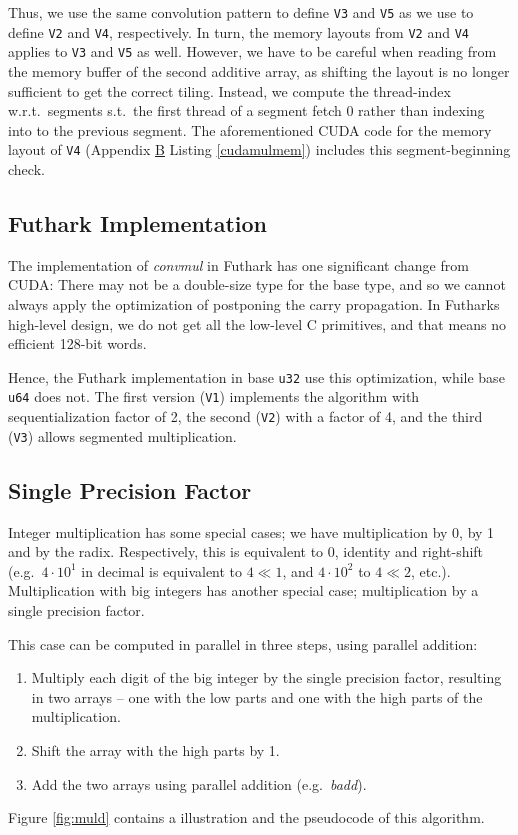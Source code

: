 Thus, we use the same convolution pattern to define \texttt{V3} and \texttt{V5}
as we use to define \texttt{V2} and \texttt{V4}, respectively. In turn, the
memory layouts from \texttt{V2} and \texttt{V4} applies to \texttt{V3} and
\texttt{V5} as well. However, we have to be careful when reading from the memory
buffer of the second additive array, as shifting the layout is no longer
sufficient to get the correct tiling. Instead, we compute the thread-index
w.r.t.\ segments s.t.\ the first thread of a segment fetch $0$ rather than
indexing into to the previous segment. The aforementioned CUDA code for the
memory layout of \texttt{V4} (Appendix \hyperref[app:B]{B} Listing
\ref{cudamulmem}) includes this segment-beginning check.

\subsection{Futhark Implementation}
\label{subsec:mulfut}

The implementation of \textit{convmul} in Futhark has one significant change
from CUDA: There may not be a double-size type for the base type, and so we
cannot always apply the optimization of postponing the carry propagation. In
Futharks high-level design, we do not get all the low-level C primitives, and
that means no efficient 128-bit words.

Hence, the Futhark implementation in base \texttt{u32} use this optimization,
while base \texttt{u64} does not. The first version (\texttt{V1}) implements the
algorithm with sequentialization factor of 2, the second (\texttt{V2}) with a
factor of 4, and the third (\texttt{V3}) allows segmented multiplication.

\subsection{Single Precision Factor}
\label{subsec:mulsin}

Integer multiplication has some special cases; we have multiplication by 0, by 1
and by the radix. Respectively, this is equivalent to 0, identity and
right-shift (e.g.\ $4 \cdot 10^1$ in decimal is equivalent to $4 \ll 1$, and
$4\cdot 10^2$ to $4\ll 2$, etc.). Multiplication with big integers has another special
case; multiplication by a single precision factor.

This case can be computed in parallel in three steps, using parallel addition:
\begin{enumerate}[label=\Roman*]
\item Multiply each digit of the big integer by the single precision factor,
  resulting in two arrays -- one with the low parts and one with the high parts
  of the multiplication.
\item Shift the array with the high parts by 1.
\item Add the two arrays using parallel addition (e.g.\ \textit{badd}).
\end{enumerate}
Figure \ref{fig:muld} contains a illustration and the pseudocode of this
algorithm.

